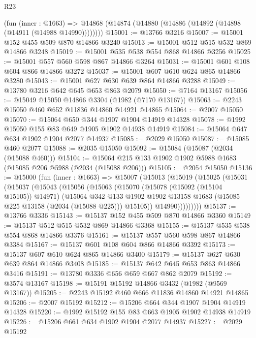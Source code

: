 \begin{lexlean}{R23}
\begin{coremodule}
    (fun (inner : @1663) =>
    @14868 (@14874 (@14880 (@14886 (@14892 (@14898 (@14911 (@14988 @14990))))))))
@15001 := @13766 @3216
@15007 := @15001 @152 @455 @509 @870 @14866 @3240
@15013 := @15001 @512 @515 @532 @869 @14866 @3248
@15019 := @15001 @535 @538 @554 @868 @14866 @3256
@15025 := @15001 @557 @560 @598 @867 @14866 @3264
@15031 := @15001 @601 @108 @604 @866 @14866 @3272
@15037 := @15001 @607 @610 @624 @865 @14866 @3280
@15043 := @15001 @627 @630 @639 @864 @14866 @3288
@15049 := @13780 @3216 @642 @645 @653 @863 @2079
@15050 := @7164 @13167
@15056 := @15049 @15050 @14866 @3304 (@1982 (@7170 @13167))
@15063 := @2243 @15050 @460 @652 @11836 @14860 @14921 @14865
@15064 := @2007 @15050
@15070 := @15064 @650 @344 @1907 @1904 @14919 @14328
@15078 := @1992 @15050 @155 @83 @649 @1905 @1902 @14938 @14919
@15084 := @15064 @647 @634 @1902 @1904 @2077 @14937
@15085 := @2029 @15050
@15087 := @15085 @460 @2077
@15088 := @2035 @15050
@15092 := @15084 (@15087 (@2034 (@15088 @460)))
@15104 := @15064 @215 @133 @1902 @1902 @5988 @1683 (@15085 @206 @5988 (@2034 (@15088 @206)))
@15105 := @2054 @15050
@15136 := @15000
    (fun (inner : @1663) =>
    @15007
      (@15013
        (@15019
          (@15025
            (@15031
              (@15037
                (@15043
                  (@15056
                    (@15063
                      (@15070
                        (@15078 (@15092 (@15104 @15105)) @14971)
                        (@15064
                          @342
                          @133
                          @1902
                          @1902
                          @13158
                          @1683
                          (@15085 @225 @13158 (@2034 (@15088 @225)))
                          @15105))
                      @14990)))))))))
@15137 := @13766 @3336
@15143 := @15137 @152 @455 @509 @870 @14866 @3360
@15149 := @15137 @512 @515 @532 @869 @14866 @3368
@15155 := @15137 @535 @538 @554 @868 @14866 @3376
@15161 := @15137 @557 @560 @598 @867 @14866 @3384
@15167 := @15137 @601 @108 @604 @866 @14866 @3392
@15173 := @15137 @607 @610 @624 @865 @14866 @3400
@15179 := @15137 @627 @630 @639 @864 @14866 @3408
@15185 := @15137 @642 @645 @653 @863 @14866 @3416
@15191 := @13780 @3336 @656 @659 @667 @862 @2079
@15192 := @3574 @13167
@15198 := @15191 @15192 @14866 @3432 (@1982 (@9569 @13167))
@15205 := @2243 @15192 @460 @666 @11836 @14860 @14921 @14865
@15206 := @2007 @15192
@15212 := @15206 @664 @344 @1907 @1904 @14919 @14328
@15220 := @1992 @15192 @155 @83 @663 @1905 @1902 @14938 @14919
@15226 := @15206 @661 @634 @1902 @1904 @2077 @14937
@15227 := @2029 @15192

\end{coremodule}
\end{lexlean}

